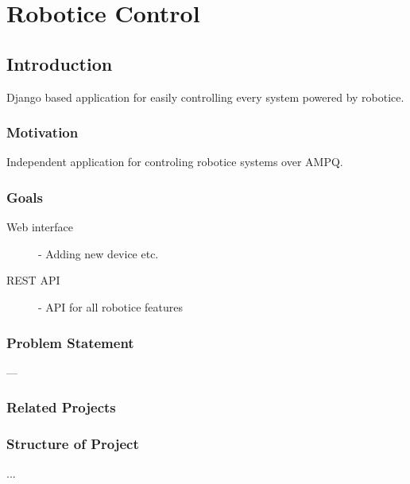 
\chapter{Robotice Control}


\section{Introduction}

Django based application for easily controlling every system powered by robotice.

\subsection{Motivation}

Independent application for controling robotice systems over AMPQ.

\subsection{Goals}

\begin{description}

\item[Web interface] - Adding new device etc.
\item[REST API] - API for all robotice features

\end{description}

\subsection{Problem Statement}

---

\subsection{Related Projects}


\subsection{Structure of Project}

...